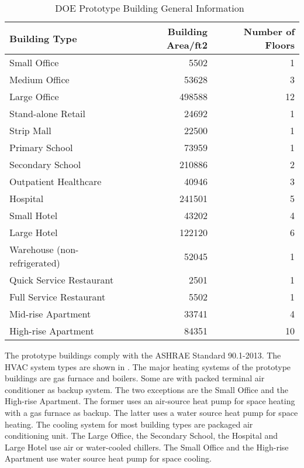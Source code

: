 \begin{table}[h!]
  \centering
  \begin{tabular}{l|r|r}
    \hline
Building Type                & Building Area/ft2 & Number of Floors\\
    \hline
Small Office                 & 5502              & 1\\
Medium Office                & 53628             & 3\\
Large Office                 & 498588            & 12\\
Stand-alone Retail           & 24692             & 1\\
Strip Mall                   & 22500             & 1\\
Primary School               & 73959             & 1\\
Secondary School             & 210886            & 2\\
Outpatient Healthcare        & 40946             & 3\\
Hospital                     & 241501            & 5\\
Small Hotel                  & 43202             & 4\\
Large Hotel                  & 122120            & 6\\
Warehouse (non-refrigerated) & 52045             & 1\\
Quick Service Restaurant     & 2501              & 1\\
Full Service Restaurant      & 5502              & 1\\
Mid-rise Apartment           & 33741             & 4\\
High-rise Apartment          & 84351             & 10\\
    \hline
\end{tabular}
\caption{DOE Prototype Building General Information~\cite{DOE2015}}
\label{tab:doeModel}
\end{table}

The prototype buildings comply with the ASHRAE Standard 90.1-2013. The
HVAC system types are shown in . The major heating
systems of the prototype buildings are gas furnace and boilers. Some
are with packed terminal air conditioner as backup system. The two
exceptions are the Small Office and the High-rise Apartment. The
former uses an air-source heat pump for space heating with a gas
furnace as backup. The latter uses a water source heat pump for space
heating. The cooling system for most building types are packaged air
conditioning unit. The Large Office, the Secondary School, the Hospital
and Large Hotel use air or water-cooled chillers. The Small Office and
the High-rise Apartment use water source heat pump for space cooling.

